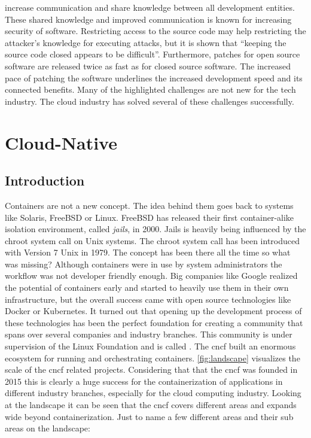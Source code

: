 \documentclass[titlepage]{report}
\begin{document}
increase communication and share knowledge between all development entities. These shared knowledge and improved communication is known for increasing
security of software\cite{hoepman2007increased}. Restricting access to the source code may help restricting the attacker's knowledge for executing attacks, but it is shown that
``keeping the source code closed appears to be difficult''\cite{mercuri2003security}. Furthermore, patches for open source software are released twice as fast
as for closed source software\cite{witten2001does}. The increased pace of patching the software underlines the increased development speed and its connected
benefits. Many of the highlighted challenges are not new for the tech industry. The cloud industry has solved several of these challenges successfully.

\chapter{Cloud-Native}
\section{Introduction}
Containers are not a new concept. The idea behind them goes back to systems like Solaris, FreeBSD or Linux. FreeBSD has released their first container-alike
isolation environment, called \emph{jails}, in 2000\cite{FreeBSD4Announcement}. Jails is heavily being influenced by the chroot system call on Unix systems.
The chroot system call has been introduced with Version 7 Unix in 1979\cite{BYTE}. The concept has been there all the time so what was missing?
Although containers were in use by system administrators the workflow was not developer friendly enough. Big companies like Google
realized the potential of containers early and started to heavily use them in their own infrastructure, but the overall success
came with open source technologies like Docker or Kubernetes. It turned out that opening up the development process of these technologies
has been the perfect foundation for creating a community that spans over several companies and industry branches. This community is under
supervision of the Linux Foundation and is called \cite{CNCFFounding}. The \gls{cncf} built an enormous ecosystem for
running and orchestrating containers. \autoref{fig:landscape} visualizes the scale of the \gls{cncf} related projects\cite{CNCFLandscape}. Considering that
that the \gls{cncf} was founded in 2015 this is clearly a huge success for the containerization of applications in different industry branches, especially
for the cloud computing industry. Looking at the landscape it can be seen that the \gls{cncf} covers different areas and expands wide beyond containerization.
Just to name a few different areas and their sub areas on the landscape:
\end{document}
